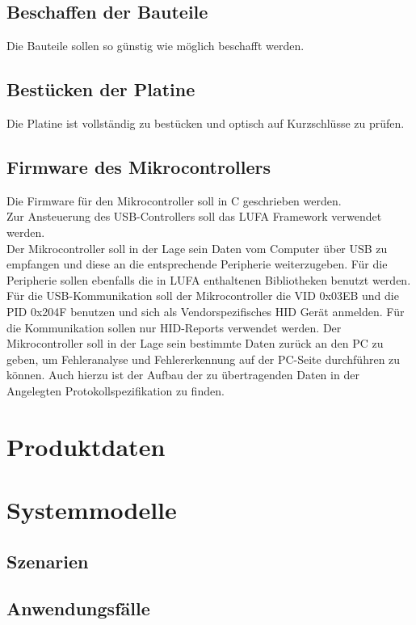 \documentclass[a4paper,12pt]{article}
\begin{document}
\subsection{Beschaffen der Bauteile}

Die Bauteile sollen so günstig wie möglich beschafft werden. 

\subsection{Bestücken der Platine}

Die Platine ist vollständig zu bestücken und optisch auf Kurzschlüsse zu prüfen.

\subsection{Firmware des Mikrocontrollers}

Die Firmware für den Mikrocontroller soll in C geschrieben werden.\\
Zur Ansteuerung des USB-Controllers soll das LUFA Framework verwendet werden.\\
Der Mikrocontroller soll in der Lage sein Daten vom Computer über USB zu empfangen und diese
an die entsprechende Peripherie weiterzugeben. Für die Peripherie sollen ebenfalls die in LUFA enthaltenen Bibliotheken
benutzt werden.\\
Für die USB-Kommunikation soll der Mikrocontroller die VID 0x03EB und die PID 0x204F benutzen und sich als Vendorspezifisches HID Gerät anmelden. Für die Kommunikation sollen nur HID-Reports verwendet werden. Der Mikrocontroller soll in der Lage sein bestimmte Daten zurück an den PC zu geben, um Fehleranalyse und Fehlererkennung auf der PC-Seite durchführen zu können.
Auch hierzu ist der Aufbau der zu übertragenden Daten in der Angelegten Protokollspezifikation zu finden.


\section{Produktdaten}

\section{Systemmodelle}
\subsection{Szenarien}
\subsection{Anwendungsfälle}

\clearpage
 
\end{document}
